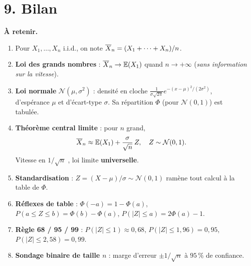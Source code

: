 \section*{9. Bilan}

\begin{mdframed}[backgroundcolor=ThemeLight, linecolor=Theme,
  linewidth=1.5pt, innertopmargin=10pt, innerbottommargin=10pt]
\textbf{À retenir.}
\begin{enumerate}
  \item Pour $X_1,\dots,X_n$ i.i.d., on note
    $\overline{X}_n = (X_1+\cdots+X_n)/n$.

  \item \textbf{Loi des grands nombres} : $\overline{X}_n\to \mathbb{E}(X_1)$
    quand $n\to +\infty$ (\emph{sans information sur la vitesse}).

  \item \textbf{Loi normale} $\mathcal{N}(\mu,\sigma^2)$ : densité
    en cloche $\tfrac{1}{\sigma\sqrt{2\pi}}e^{-(x-\mu)^2/(2\sigma^2)}$,
    d'espérance $\mu$ et d'écart-type $\sigma$. Sa répartition
    $\Phi$ (pour $\mathcal{N}(0,1)$) est tabulée.

  \item \textbf{Théorème central limite} : pour $n$ grand,
    \[
      \overline{X}_n\approx \mathbb{E}(X_1)+\dfrac{\sigma}{\sqrt{n}}\,Z,
      \quad Z\sim\mathcal{N}(0,1).
    \]
    Vitesse \og en $1/\sqrt{n}$ \fg, loi limite \textbf{universelle}.

  \item \textbf{Standardisation} : $Z=(X-\mu)/\sigma\sim\mathcal{N}(0,1)$
    ramène tout calcul à la table de $\Phi$.

  \item \textbf{Réflexes de table} : $\Phi(-a)=1-\Phi(a)$,
    $P(a\le Z\le b)=\Phi(b)-\Phi(a)$, $P(|Z|\le a)=2\Phi(a)-1$.

  \item \textbf{Règle 68 / 95 / 99} :
    $P(|Z|\le 1)\approx 0{,}68$, $P(|Z|\le 1{,}96)=0{,}95$,
    $P(|Z|\le 2{,}58)=0{,}99$.

  \item \textbf{Sondage binaire de taille $n$} : marge d'erreur
    $\pm 1/\sqrt{n}$ à $95\,\%$ de confiance.
\end{enumerate}
\end{mdframed}


